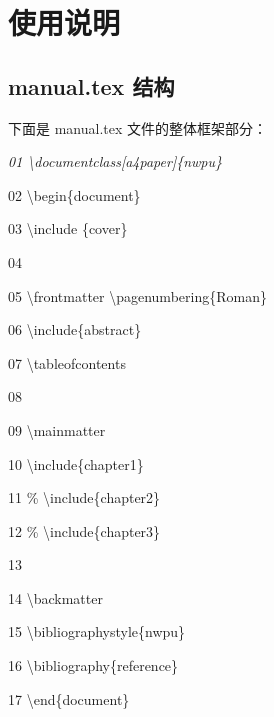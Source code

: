 \documentclass[twoside]{nwpu}
\begin{document}
    \chapter{使用说明}
        \section{manual.tex 结构}
            下面是 manual.tex 文件的整体框架部分：
                \vskip 10pt
                \hskip 1cm
                \begin{minipage}[t]{8cm}
                    \it
                    01 \qquad\textbackslash documentclass[a4paper]\{nwpu\}   \par
                    02 \qquad\textbackslash begin\{document\}                \par
                    03 \qquad\textbackslash include \{cover\}                \par
                    04 \                                               \par
                    05 \qquad\textbackslash frontmatter  \qquad\textbackslash pagenumbering\{Roman\} \par
                    06 \qquad\textbackslash include\{abstract\}              \par
                    07 \qquad\textbackslash tableofcontents                  \par
                    08 \                                               \par
                    09 \qquad\textbackslash mainmatter                       \par
                    10 \qquad\textbackslash include\{chapter1\}              \par
                    11 \qquad\% \textbackslash include\{chapter2\}           \par
                    12 \qquad\% \textbackslash include\{chapter3\}           \par
                    13 \                                               \par
                    14 \qquad\textbackslash backmatter                       \par
                    15 \qquad\textbackslash bibliographystyle\{nwpu\}        \par
                    16 \qquad\textbackslash bibliography\{reference\}        \par
                    17 \qquad\textbackslash end\{document\}                  \par
                \end{minipage}
\end{document}
